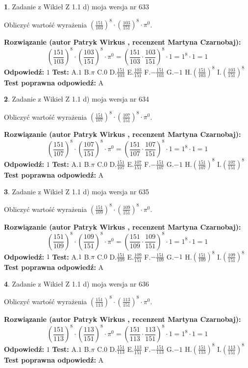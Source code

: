 \documentclass[12pt, a4paper]{article}
\theoremstyle{definition} %
\newtheorem{zad}{}
\newcommand{\zadStart}[1]{\begin{zad}#1\newline}
\newcommand{\zadStop}{\end{zad}}
\newcommand{\rozwStart}[2]{\noindent \textbf{Rozwiązanie (autor #1 , recenzent #2): }\newline}
\newcommand{\rozwStop}{\newline}
\newcommand{\odpStart}{\noindent \textbf{Odpowiedź:}\newline}
\newcommand{\odpStop}{\newline}
\newcommand{\testStart}{\noindent \textbf{Test:}\newline}
\newcommand{\testStop}{\newline}
\newcommand{\kluczStart}{\noindent \textbf{Test poprawna odpowiedź:}\newline}
\newcommand{\kluczStop}{\newline}
\begin{document}
\zadStart{Zadanie z Wikieł Z 1.1 d) moja wersja nr 633}

Obliczyć wartość wyrażenia $(\frac{151}{103})^{8} \cdot (\frac{103}{151})^{8} \cdot \pi^{0}$.
\zadStop
\rozwStart{Patryk Wirkus}{Martyna Czarnobaj}
$$(\frac{151}{103})^{8} \cdot (\frac{103}{151})^{8} \cdot \pi^{0} = (\frac{151}{103} \cdot \frac{103}{151})^{8} \cdot 1 = 1^{8} \cdot 1 = 1$$
\rozwStop
\odpStart
$1$
\odpStop
\testStart
A.$1$ B.$\pi$ C.$0$ D.$\frac{151}{103}$ E.$\frac{103}{151}$
F.$-\frac{151}{103}$ G.$-1$
H.$(\frac{151}{103})^{8}$
I.$(\frac{103}{151})^{8}$
\testStop
\kluczStart
A
\kluczStop



\zadStart{Zadanie z Wikieł Z 1.1 d) moja wersja nr 634}

Obliczyć wartość wyrażenia $(\frac{151}{107})^{8} \cdot (\frac{107}{151})^{8} \cdot \pi^{0}$.
\zadStop
\rozwStart{Patryk Wirkus}{Martyna Czarnobaj}
$$(\frac{151}{107})^{8} \cdot (\frac{107}{151})^{8} \cdot \pi^{0} = (\frac{151}{107} \cdot \frac{107}{151})^{8} \cdot 1 = 1^{8} \cdot 1 = 1$$
\rozwStop
\odpStart
$1$
\odpStop
\testStart
A.$1$ B.$\pi$ C.$0$ D.$\frac{151}{107}$ E.$\frac{107}{151}$
F.$-\frac{151}{107}$ G.$-1$
H.$(\frac{151}{107})^{8}$
I.$(\frac{107}{151})^{8}$
\testStop
\kluczStart
A
\kluczStop



\zadStart{Zadanie z Wikieł Z 1.1 d) moja wersja nr 635}

Obliczyć wartość wyrażenia $(\frac{151}{109})^{8} \cdot (\frac{109}{151})^{8} \cdot \pi^{0}$.
\zadStop
\rozwStart{Patryk Wirkus}{Martyna Czarnobaj}
$$(\frac{151}{109})^{8} \cdot (\frac{109}{151})^{8} \cdot \pi^{0} = (\frac{151}{109} \cdot \frac{109}{151})^{8} \cdot 1 = 1^{8} \cdot 1 = 1$$
\rozwStop
\odpStart
$1$
\odpStop
\testStart
A.$1$ B.$\pi$ C.$0$ D.$\frac{151}{109}$ E.$\frac{109}{151}$
F.$-\frac{151}{109}$ G.$-1$
H.$(\frac{151}{109})^{8}$
I.$(\frac{109}{151})^{8}$
\testStop
\kluczStart
A
\kluczStop



\zadStart{Zadanie z Wikieł Z 1.1 d) moja wersja nr 636}

Obliczyć wartość wyrażenia $(\frac{151}{113})^{8} \cdot (\frac{113}{151})^{8} \cdot \pi^{0}$.
\zadStop
\rozwStart{Patryk Wirkus}{Martyna Czarnobaj}
$$(\frac{151}{113})^{8} \cdot (\frac{113}{151})^{8} \cdot \pi^{0} = (\frac{151}{113} \cdot \frac{113}{151})^{8} \cdot 1 = 1^{8} \cdot 1 = 1$$
\rozwStop
\odpStart
$1$
\odpStop
\testStart
A.$1$ B.$\pi$ C.$0$ D.$\frac{151}{113}$ E.$\frac{113}{151}$
F.$-\frac{151}{113}$ G.$-1$
H.$(\frac{151}{113})^{8}$
I.$(\frac{113}{151})^{8}$
\testStop
\kluczStart
A
\kluczStop
\end{document}
